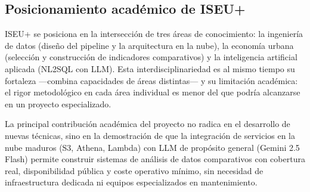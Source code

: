 \subsection{Posicionamiento académico de ISEU+}

ISEU+ se posiciona en la intersección de tres áreas de conocimiento: la ingeniería de datos (diseño del pipeline y la arquitectura en la nube), la economía urbana (selección y construcción de indicadores comparativos) y la inteligencia artificial aplicada (NL2SQL con LLM). Esta interdisciplinariedad es al mismo tiempo su fortaleza —combina capacidades de áreas distintas— y su limitación académica: el rigor metodológico en cada área individual es menor del que podría alcanzarse en un proyecto especializado.

La principal contribución académica del proyecto no radica en el desarrollo de nuevas técnicas, sino en la demostración de que la integración de servicios en la nube maduros (S3, Athena, Lambda) con LLM de propósito general (Gemini 2.5 Flash) permite construir sistemas de análisis de datos comparativos con cobertura real, disponibilidad pública y coste operativo mínimo, sin necesidad de infraestructura dedicada ni equipos especializados en mantenimiento.
